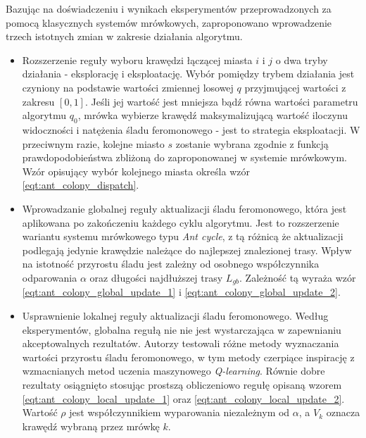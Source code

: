 {{{            Bazując na doświadczeniu i wynikach eksperymentów przeprowadzonych za pomocą klasycznych systemów
            mrówkowych, zaproponowano wprowadzenie trzech istotnych zmian w zakresie działania algorytmu.

            \begin{itemize}
                \item Rozszerzenie reguły wyboru krawędzi łączącej miasta $i$ i $j$ o dwa tryby działania - eksplorację
                i eksploatację. Wybór pomiędzy trybem działania jest czyniony na podstawie wartości zmiennej losowej $q$
                przyjmującej wartości z zakresu $[0, 1]$. Jeśli jej wartość jest mniejsza bądź równa wartości parametru
                algorytmu $q_0$, mrówka wybierze krawędź maksymalizującą wartość iloczynu widoczności i natężenia śladu
                feromonowego - jest to strategia eksploatacji. W przeciwnym razie, kolejne miasto $s$ zostanie wybrana
                zgodnie z funkcją prawdopodobieństwa zbliżoną do zaproponowanej w systemie mrówkowym. Wzór opisujący
                wybór kolejnego miasta określa wzór \ref{eqt:ant_colony_dispatch}.

                \item Wprowadzanie globalnej reguły aktualizacji śladu feromonowego, która jest aplikowana po
                zakończeniu każdego cyklu algorytmu. Jest to rozszerzenie wariantu systemu mrówkowego typu \textit{Ant
                cycle}, z tą różnicą że aktualizacji podlegają jedynie krawędzie należące do najlepszej znalezionej
                trasy. Wpływ na istotność przyrostu śladu jest zależny od osobnego współczynnika odparowania $\alpha$
                oraz długości najdłuższej trasy $L_{gb}$. Zależność tą wyraża wzór \ref{eqt:ant_colony_global_update_1}
                i \ref{eqt:ant_colony_global_update_2}.

                \item Usprawnienie lokalnej reguły aktualizacji śladu feromonowego. Według eksperymentów, globalna
                regułą nie nie jest wystarczająca w zapewnianiu akceptowalnych rezultatów. Autorzy testowali różne
                metody wyznaczania wartości przyrostu śladu feromonowego, w tym metody czerpiące inspirację z
                wzmacnianych metod uczenia maszynowego \textit{Q-learning}\cite{Watkins1989LearningFD}. Równie dobre
                rezultaty osiągnięto stosując prostszą obliczeniowo regułę opisaną wzorem
                \ref{eqt:ant_colony_local_update_1} oraz \ref{eqt:ant_colony_local_update_2}. Wartość $\rho$ jest
                współczynnikiem wyparowania niezależnym od $\alpha$, a $V_k$ oznacza krawędź wybraną przez mrówkę $k$.
            \end{itemize}

}}}
